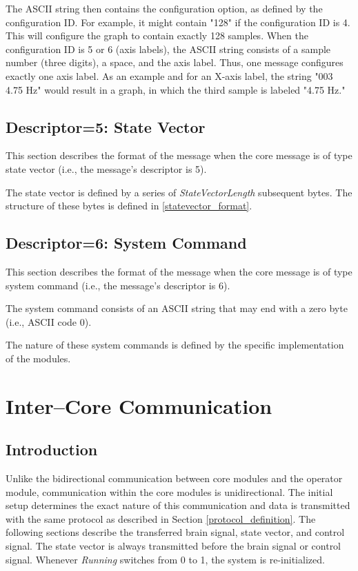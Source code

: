 \documentclass[letterpaper,oneside,12pt]{book}
\begin{document}
The ASCII string then contains the configuration option, as defined by the 
configuration ID. For example, it might contain "128" if the configuration ID 
is 4. This will configure the graph to contain exactly 128 samples. When the 
configuration ID is 5 or 6 (axis labels), the ASCII string consists of a sample 
number (three digits), a space, and the axis label. Thus, one message configures 
exactly one axis label. As an example and for an X-axis label, the string "003 
4.75 Hz" would result in a graph, in which the third sample is labeled "4.75 
Hz."


\subsection{Descriptor=5: State Vector}
\label{statevector}

This section describes the format of the message when the core message is of 
type state vector (i.e., the message's descriptor is 5). 

The state vector is defined by a series of \textit{StateVectorLength} subsequent 
bytes. The structure of these bytes is defined in \ref{statevector_format}.


\subsection{Descriptor=6: System Command}
\label{sec:syscmd}

This section describes the format of the message when the core message is of 
type system command (i.e., the message's descriptor is 6). 

The system command consists of an ASCII string that may end with a zero byte 
(i.e., ASCII code 0).

The nature of these system commands is defined by the specific implementation of 
the modules.


\section{Inter--Core Communication}

\subsection{Introduction}

Unlike the bidirectional communication between core modules and the operator 
module, communication within the core modules is unidirectional. The initial 
setup determines the exact nature of this communication and data is transmitted 
with the same protocol as described in Section \ref{protocol_definition}. The 
following sections describe the transferred brain signal, state vector, and 
control signal. The state vector is always transmitted before the brain 
signal or control signal. Whenever \textit{Running} switches from 0 to 1, the 
system is re-initialized.
\end{document}
